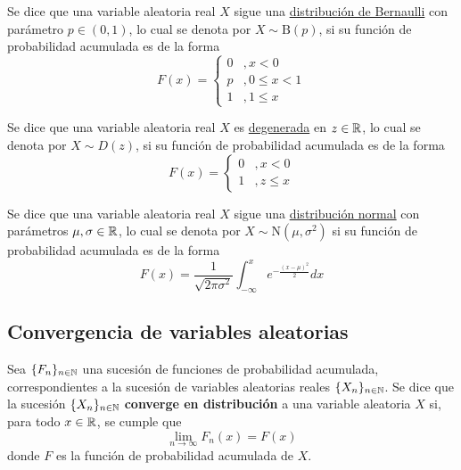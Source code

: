 \begin{ejemplo}
Se dice que una variable aleatoria real $X$ sigue una \ul{distribuci\'on de Bernaulli} con parámetro $p\in (0,1)$, lo cual se denota por $X\sim \text{B}(p)$, si su función de probabilidad acumulada es de la forma
\begin{equation}
F(x) = \begin{cases}
0 &, x < 0 \\
p &, 0 \leq x < 1 \\
1 &, 1 \leq x
\end{cases}
\end{equation}
\end{ejemplo}

\begin{ejemplo}
Se dice que una variable aleatoria real $X$ es \ul{degenerada} en $z\in \mathbb{R}$, lo cual se denota por $X\sim D(z)$, si su función de probabilidad acumulada es de la forma
\begin{equation}
F(x) = \begin{cases}
0 &, x < 0 \\
1 &, z \leq x
\end{cases}
\end{equation}
\end{ejemplo}

\begin{ejemplo}
Se dice que una variable aleatoria real $X$ sigue una \ul{distribuci\'on normal} con parámetros $\mu, \sigma \in \mathbb{R}$, lo cual se denota por $X\sim \text{N}(\mu,\sigma^{2})$ si su función de probabilidad acumulada es de la forma
\begin{equation}
F(x) = \frac{1}{\sqrt{2 \pi \sigma^{2}}} \int_{-\infty}^{x} e^{-\frac{(x-\mu)^{2}}{2}} dx
\end{equation}
\end{ejemplo}


\subsection{Convergencia de variables aleatorias}

\begin{definicion}
Sea $\{ F_n \}_{n\in \mathbb{N}}$ una sucesión de funciones de probabilidad acumulada, correspondientes a la sucesión de variables aleatorias reales $\{ X_n \}_{n\in \mathbb{N}}$. Se dice que la sucesión $\{ X_n \}_{n\in \mathbb{N}}$ \textbf{converge en distribución} a una variable aleatoria $X$ si, para todo $x\in \mathbb{R}$, se cumple que
\begin{equation}
\lim_{n\rightarrow\infty} F_n(x) = F(x)
\end{equation}
donde $F$ es la función de probabilidad acumulada de $X$.
\end{definicion}

